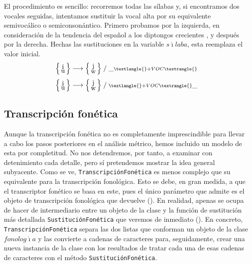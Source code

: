 El procedimiento es sencillo: recorremos todas las sílabas y, si encontramos dos vocales seguidas, intentamos sustituir la vocal alta por su equivalente semivocálico o semiconsonántico. Primero probamos por la izquierda, en consideración de la tendencia del español a los diptongos crecientes \parencites{alarcos1964}{navarrotomas2004}{quilis2019}, y después por la derecha. Hechas las sustituciones en la variable $s\acute{\imath}laba$, esta reemplaza el valor inicial.
\[ \Big\{\begin{smallmatrix}\text{\normalsize{i}}\\\text{\normalsize{u}}\end{smallmatrix}\Big\} \longrightarrow \Big\{\begin{smallmatrix}\text{\normalsize{j}}\\\text{\normalsize{w}}\end{smallmatrix}\Big\}\;/\; \_  {\scriptstyle\textlangle{}+VOC\textrangle{}} \]
\[ \Big\{\begin{smallmatrix}\text{\normalsize{i}}\\\text{\normalsize{u}}\end{smallmatrix}\Big\} \longrightarrow \Big\{\begin{smallmatrix}\text{\normalsize{j}}\\\text{\normalsize{w}}\end{smallmatrix}\Big\}\;/\; {\scriptstyle\textlangle{}+VOC\textrangle{}} \_  \]

\subsection{Transcripción fonética}\label{met:fnt}
Aunque la transcripción fonética no es completamente imprescindible para llevar a cabo los pasos posteriores en el análisis métrico, hemos incluido un modelo de esta por completitud. No nos detendremos, por tanto, a examinar con detenimiento cada detalle, pero sí pretendemos mostrar la idea general subyacente. Como se ve, \texttt{TranscripciónFonética} es menos complejo que su equivalente para la transcripción fonológica. Esto se debe, en gran medida, a que el transcriptor fonético se basa en este, pues el único parámetro que admite es el objeto de transcripción fonológica que devuelve (). En realidad, apenas se ocupa de hacer de intermediario entre un objeto de la clase \Valoresp y la función de sustitución más detallada \texttt{SustituciónFonética} que veremos de inmediato (). En concreto, \texttt{TranscripciónFonética} separa las dos listas que conforman un objeto de la clase $fonolog\acute{\imath}a$ y las convierte a cadenas de caracteres para, seguidamente, crear una nueva instancia de la clase \Valoresp con los resultados de tratar cada una de esas cadenas de caracteres con el método \texttt{SustituciónFonética}.

